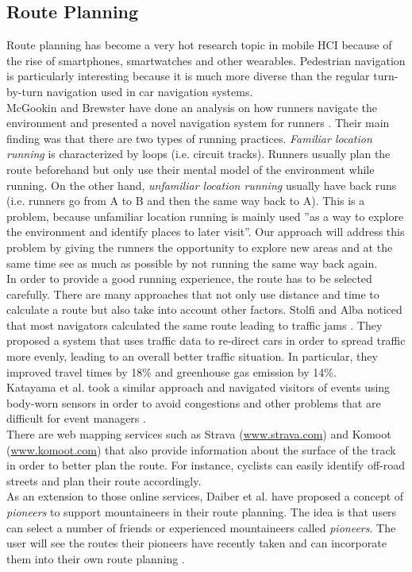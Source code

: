 \documentclass{sigchi}
\begin{document}
\subsection{Route Planning}
Route planning has become a very hot research topic in mobile HCI because of the rise of smartphones, smartwatches and other wearables. Pedestrian navigation is particularly interesting because it is much more diverse than the regular turn-by-turn navigation used in car navigation systems.\\
McGookin and Brewster have done an analysis on how runners navigate the environment and presented a novel navigation system for runners \cite{undirectedrunnernav}. Their main finding was that there are two types of running practices. \textit{Familiar location running} is characterized by loops (i.e. circuit tracks). Runners usually plan the route beforehand but only use their mental model of the environment while running. On the other hand, \textit{unfamiliar location running} usually have back runs (i.e. runners go from A to B and then the same way back to A). This is a problem, because unfamiliar location running is mainly used ''as a way to explore the environment and identify places to later visit''. Our approach will address this problem by giving the runners the opportunity to explore new areas and at the same time see as much as possible by not running the same way back again.\\
In order to provide a good running experience, the route has to be selected carefully. There are many approaches that not only use distance and time to calculate a route but also take into account other factors. Stolfi and Alba noticed that most navigators calculated the same route leading to traffic jams \cite{evolutionaryalgonav}. They proposed a system that uses traffic data to re-direct cars in order to spread traffic more evenly, leading to an overall better traffic situation. In particular, they improved travel times by 18\% and greenhouse gas emission by 14\%.\\
Katayama et al. took a similar approach and navigated visitors of events using body-worn sensors in order to avoid congestions and other problems that are difficult for event managers \cite{routeplanningbodywornsensors}.\\
There are web mapping services such as Strava (\hyperlink{http://strava.com}{www.strava.com}) and Komoot (\hyperlink{http://komoot.com}{www.komoot.com}) that also provide information about the surface of the track in order to better plan the route. For instance, cyclists can easily identify off-road streets and plan their route accordingly.\\
As an extension to those online services, Daiber et al. have proposed a concept of \textit{pioneers} to support mountaineers in their route planning. The idea is that users can select a number of friends or experienced mountaineers called \textit{pioneers}. The user will see the routes their pioneers have recently taken and can incorporate them into their own route planning \cite{followthepioneers}. \\
\end{document}
